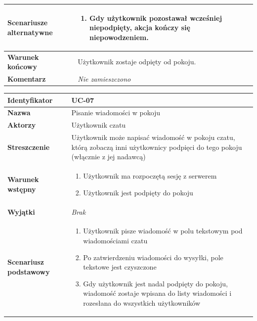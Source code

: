 \documentclass[11pt,oneside,a4paper,titlepage,onecolumn]{article}
\newenvironment{enumreq}
{ \begin{enumerate}[topsep=0pt,itemsep=-1ex,partopsep=1ex,parsep=1ex] }
{ \end{enumerate}                  }
\begin{document}
{\begin{tabular}{ | l | l | }
	\hline
		\parbox[t]{4cm}{\textbf{Scenariusze alternatywne}} & \parbox[t]
		{11cm}{
			\begin{enumreq}
				\item Gdy użytkownik pozostawał wcześniej niepodpięty, akcja
				kończy się niepowodzeniem.
			\end{enumreq}
		}
		\\
		
	\hline
		\parbox[t]{4cm}{\textbf{Warunek końcowy}} & \parbox[t]{11cm}{
			Użytkownik zostaje odpięty od pokoju.
		}
		\\
		
	\hline
		\parbox[t]{4cm}{\textbf{Komentarz}} & \parbox[t]{11cm}{
			\textit{Nie zamieszczono}
		}
		\\

	\hline
\end{tabular}

\vspace{2em}

\begin{tabular}{ | l | l | }
	\hline
		\textbf{Identyfikator} & 
		UC-07
		\\
		
	\hline
		\textbf{Nazwa} & 
		Pisanie wiadomości w pokoju
		\\
		
	\hline
		\textbf{Aktorzy} & \parbox[t]{11cm}{
			Użytkownik czatu
		}\\
		 
	\hline
		\parbox[t]{4cm}{\textbf{Streszczenie}} & \parbox[t]{11cm}{
			Użytkownik może napisać wiadomość w pokoju czatu, którą zobaczą
			inni użytkownicy podpięci do tego pokoju (włącznie z jej nadawcą)	
		}\\
		
	\hline
		\parbox[t]{4cm}{\textbf{Warunek wstępny}} & \parbox[t]{11cm}{
			\begin{enumreq}
				\item Użytkownik ma rozpoczętą sesję z serwerem
				\item Użytkownik jest podpięty do pokoju
			\end{enumreq}
				
		}
		\\
		
	\hline
		\parbox[t]{4cm}{\textbf{Wyjątki}} & \parbox[t]{11cm}{
			\textit{Brak}
			
		}
		\\

	\hline
		\parbox[t]{4cm}{\textbf{Scenariusz podstawowy}} & \parbox[t]{11cm}{
			\begin{enumreq}
				\item Użytkownik pisze wiadomość w polu tekstowym
				pod wiadomościami czatu
				\item Po zatwierdzeniu wiadomości do wysyłki, pole tekstowe
				jest czyszczone
				\item Gdy użytkownik jest nadal podpięty do pokoju, wiadomość
				zostaje wpisana do listy wiadomości i rozesłana do wszystkich
				użytkowników
			\end{enumreq}
		}
		\\
		

\end{tabular}}
\end{document}
